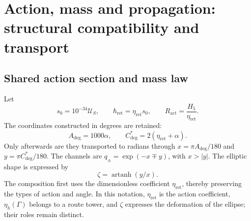 \section{Action, mass and propagation: structural compatibility and transport}
\label{md:hib:seccion}

\subsection{Shared action section and mass law}
\label{md:hib:accion-masas}

Let
\begin{equation}
 s_0=10^{-34}\mathcal U_S,\qquad
 \hbar_{\mathrm{ret}}=\eta_{\mathrm{ret}}s_0,\qquad
 R_{\mathrm{act}}=\frac{H_5}{\eta_{\mathrm{ret}}}.
 \label{md:hib:accion}
\end{equation}
The coordinates constructed in degrees are retained:
\begin{equation}
 A_{\deg}=1000\alpha,\qquad
 C^*_{\deg}=2(\eta_{\mathrm{ret}}+\alpha).
 \label{md:hib:angulos}
\end{equation}
Only afterwards are they transported to radians through
$x=\pi A_{\deg}/180$ and $y=\pi C^*_{\deg}/180$. The channels are
$q_\pm=\exp(-x\mp y)$, with $x>|y|$. The elliptic shape is expressed by
\begin{equation}
 \zeta=\operatorname{artanh}(y/x).
 \label{md:hib:forma}
\end{equation}
The composition first uses the dimensionless coefficient
$\eta_{\mathrm{ret}}$, thereby preserving the types of action and angle.
In this notation, $\eta_{\mathrm{ret}}$ is the action coefficient,
$\eta_h(\Gamma)$ belongs to a route tower, and $\zeta$ expresses the
deformation of the ellipse; their roles remain distinct.

